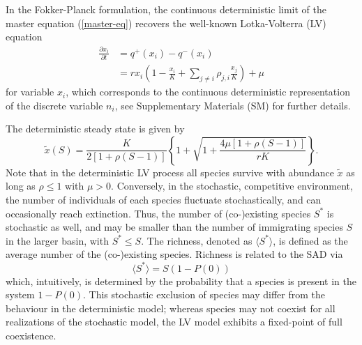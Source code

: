 \documentclass[9pt,twocolumn,twoside,lineno]{pnas-new}
\begin{document}
\iffalse
The full master of the Equation...  can be reduced to the one dimensional master equation for the marginal distribution $P(n)$ with effective birth-death rates (see SM for derivation)[AZ: is this an exact reduction, or there is an approximation involved?]

\begin{eqnarray}
q^+(n)&=&r^+ n +\mu,  \\
q^-(n)&=&r^- n + \frac{r}{K} n \left((1-\rho)n + \rho \langle J | n_i = n \rangle \right). \nonumber
\end{eqnarray}
\fi

In the Fokker-Planck formulation, the continuous deterministic limit of the master equation (\ref{master-eq}) recovers the well-known Lotka-Volterra (LV) equation
\begin{align}
    \frac{\partial x_i}{\partial t}&= q^+(x_i) - q^-(x_i)\nonumber\\
    &=r x_i \left( 1 - \frac{x_i}{K} + \sum_{j\neq i} \rho_{j,i}\frac{x_j}{K} \right) + \mu 
    \label{eq:LV}
\end{align}
for variable $x_i$, which corresponds to the continuous deterministic representation of the discrete variable $n_i$, see Supplementary Materials (SM) for further details. 

The deterministic steady state is given by
\begin{equation}
    \tilde{x}(S) = \frac{K}{2[1+\rho(S-1)]}\left\{1 +  \sqrt{1+\frac{4\mu[1+\rho(S -1)]}{r K}}\right\}.
    \label{eq:fixed-LV}
\end{equation}
Note that in the deterministic LV process all species survive with abundance $\tilde{x}$ as long as $\rho\leq 1$ with $\mu>0$.
Conversely, in the stochastic, competitive environment, the number of individuals of each species fluctuate stochastically, and can occasionally reach extinction. 
Thus, the number of (co-)existing species $S^*$ is stochastic as well, and may be smaller than the number of immigrating species $S$ in the larger basin, with $S^*\leq S$.
The richness, denoted as $\langle S^* \rangle $, is defined as the average number of the (co-)existing species.
Richness is related to the SAD  via
\begin{equation}
\label{eq:richness}
\langle S^* \rangle = S(1-P(0))
\end{equation}
which, intuitively, is determined by the probability that a species is present in the system $1-P(0)$.
This stochastic exclusion of species may differ from the behaviour in the deterministic model; whereas species may not coexist for all realizations of the stochastic model, the LV model exhibits a fixed-point of full coexistence.
\end{document}
